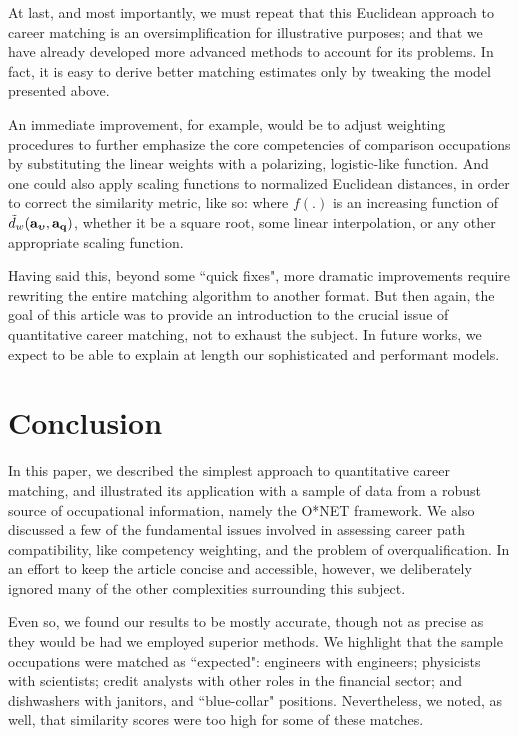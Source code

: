 \documentclass{article}
\begin{document}
At last, and most importantly, we must repeat that this Euclidean approach to career matching is an oversimplification for illustrative purposes; and that we have already developed more advanced methods to account for its problems. In fact, it is easy to derive better matching estimates only by tweaking the model presented above.

An immediate improvement, for example, would be to adjust weighting procedures to further emphasize the core competencies of comparison occupations by substituting the linear weights with a polarizing, logistic-like function. And one could also apply scaling functions to normalized Euclidean distances, in order to correct the similarity metric, like so:
\SimilarityScaling
where $f(.)$ is an increasing function of $\tilde{d}_w(\vb{a_{\boldsymbol{\upsilon}}}, \vb{a_{q}})$, whether it be a square root, some linear interpolation, or any other appropriate scaling function.

Having said this, beyond some ``quick fixes", more dramatic improvements require rewriting the entire matching algorithm to another format. But then again, the goal of this article was to provide an introduction to the crucial issue of quantitative career matching, not to exhaust the subject. In future works, we expect to be able to explain at length our sophisticated and performant models.

\section{Conclusion}
In this paper, we described the simplest approach to quantitative career matching, and illustrated its application with a sample of data from a robust source of occupational information, namely the O*NET framework. We also discussed a few of the fundamental issues involved in assessing career path compatibility, like competency weighting, and the problem of overqualification. In an effort to keep the article concise and accessible, however, we deliberately ignored many of the other complexities surrounding this subject.

Even so, we found our results to be mostly accurate, though not as precise as they would be had we employed superior methods. We highlight that the sample occupations were matched as ``expected": engineers with engineers; physicists with scientists; credit analysts with other roles in the financial sector; and dishwashers with janitors, and ``blue-collar" positions. Nevertheless, we noted, as well, that similarity scores were too high for some of these matches.
\end{document}
